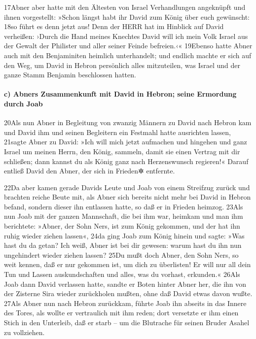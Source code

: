 17Abner aber hatte mit den Ältesten von Israel Verhandlungen angeknüpft
und ihnen vorgestellt: »Schon längst habt ihr David zum König über euch
gewünscht: 18so führt es denn jetzt aus! Denn der HERR hat im Hinblick
auf David verheißen: ›Durch die Hand meines Knechtes David will ich mein
Volk Israel aus der Gewalt der Philister und aller seiner Feinde
befreien.‹« 19Ebenso hatte Abner auch mit den Benjaminiten heimlich
unterhandelt; und endlich machte er sich auf den Weg, um David in Hebron
persönlich alles mitzuteilen, was Israel und der ganze Stamm Benjamin
beschlossen hatten.

\hypertarget{c-abners-zusammenkunft-mit-david-in-hebron-seine-ermordung-durch-joab}{%
\paragraph{c) Abners Zusammenkunft mit David in Hebron; seine Ermordung
durch
Joab}\label{c-abners-zusammenkunft-mit-david-in-hebron-seine-ermordung-durch-joab}}

20Als nun Abner in Begleitung von zwanzig Männern zu David nach Hebron
kam und David ihm und seinen Begleitern ein Festmahl hatte ausrichten
lassen, 21sagte Abner zu David: »Ich will mich jetzt aufmachen und
hingehen und ganz Israel um meinen Herrn, den König, sammeln, damit sie
einen Vertrag mit dir schließen; dann kannst du als König ganz nach
Herzenswunsch regieren!« Darauf entließ David den Abner, der sich in
Frieden✲ entfernte.

22Da aber kamen gerade Davids Leute und Joab von einem Streifzug zurück
und brachten reiche Beute mit, als Abner sich bereits nicht mehr bei
David in Hebron befand, sondern dieser ihn entlassen hatte, so daß er in
Frieden heimzog. 23Als nun Joab mit der ganzen Mannschaft, die bei ihm
war, heimkam und man ihm berichtete: »Abner, der Sohn Ners, ist zum
König gekommen, und der hat ihn ruhig wieder ziehen lassen«, 24da ging
Joab zum König hinein und sagte: »Was hast du da getan? Ich weiß, Abner
ist bei dir gewesen: warum hast du ihn nun ungehindert wieder ziehen
lassen? 25Du mußt doch Abner, den Sohn Ners, so weit kennen, daß er nur
gekommen ist, um dich zu überlisten! Er will nur all dein Tun und Lassen
auskundschaften und alles, was du vorhast, erkunden.« 26Als Joab dann
David verlassen hatte, sandte er Boten hinter Abner her, die ihn von der
Zisterne Sira wieder zurückholen mußten, ohne daß David etwas davon
wußte. 27Als Abner nun nach Hebron zurückkam, führte Joab ihn abseits in
das Innere des Tores, als wollte er vertraulich mit ihm reden; dort
versetzte er ihm einen Stich in den Unterleib, daß er starb -- um die
Blutrache für seinen Bruder Asahel zu vollziehen.

